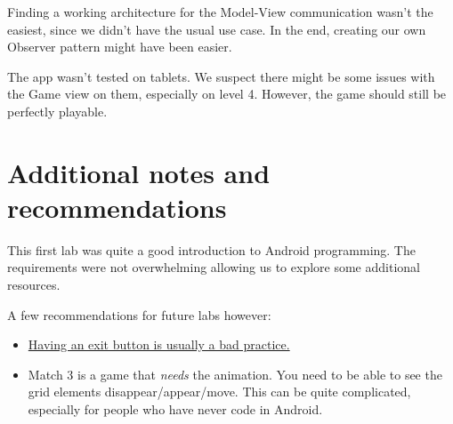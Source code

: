 \documentclass{article}
\begin{document}
Finding a working architecture for the Model-View communication wasn't the easiest, since we didn't have the usual use case. In the end, creating our own Observer pattern might have been easier.

The app wasn't tested on tablets. We suspect there might be some issues with the Game view on them, especially on level 4. However, the game should still be perfectly playable.

\section{Additional notes and recommendations}

This first lab was quite a good introduction to Android programming. The requirements were not overwhelming allowing us to explore some additional resources. 

A few recommendations for future labs however:

\begin{itemize}
\item \href{https://www.quora.com/Why-dont-Android-apps-have-an-exit-button}{Having an exit button is usually a bad practice.}
\item Match 3 is a game that \textit{needs} the animation. You need to be able to see the grid elements disappear/appear/move. This can be quite complicated, especially for people who have never code in Android.
\end{itemize}
\end{document}

